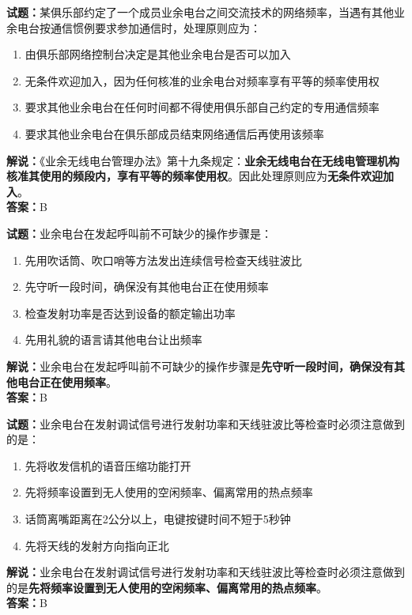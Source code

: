 \documentclass{ctexbook}
\begin{document}
\noindent\textbf{试题：}某俱乐部约定了一个成员业余电台之间交流技术的网络频率，当遇有其他业余电台按通信惯例要求参加通信时，处理原则应为：
\begin{enumerate}[leftmargin=3em]
\item 由俱乐部网络控制台决定是其他业余电台是否可以加入
\item 无条件欢迎加入，因为任何核准的业余电台对频率享有平等的频率使用权
\item 要求其他业余电台在任何时间都不得使用俱乐部自己约定的专用通信频率
\item 要求其他业余电台在俱乐部成员结束网络通信后再使用该频率
\end{enumerate}
\noindent\textbf{解说：}《业余无线电台管理办法》第十九条规定：\textbf{业余无线电台在无线电管理机构核准其使用的频段内，享有平等的频率使用权}。因此处理原则应为\textbf{无条件欢迎加入}。\\\noindent\textbf{答案：}B



\bigskip


\noindent\textbf{试题：}业余电台在发起呼叫前不可缺少的操作步骤是：
\begin{enumerate}[leftmargin=3em]
\item 先用吹话筒、吹口哨等方法发出连续信号检查天线驻波比
\item 先守听一段时间，确保没有其他电台正在使用频率
\item 检查发射功率是否达到设备的额定输出功率
\item 先用礼貌的语言请其他电台让出频率
\end{enumerate}
\noindent\textbf{解说：}业余电台在发起呼叫前不可缺少的操作步骤是\textbf{先守听一段时间，确保没有其他电台正在使用频率}。\\\noindent\textbf{答案：}B




\bigskip


\noindent\textbf{试题：}业余电台在发射调试信号进行发射功率和天线驻波比等检查时必须注意做到的是：
\begin{enumerate}[leftmargin=3em]
\item 先将收发信机的语音压缩功能打开
\item 先将频率设置到无人使用的空闲频率、偏离常用的热点频率
\item 话筒离嘴距离在2公分以上，电键按键时间不短于5秒钟
\item 先将天线的发射方向指向正北
\end{enumerate}
\noindent\textbf{解说：}业余电台在发射调试信号进行发射功率和天线驻波比等检查时必须注意做到的是\textbf{先将频率设置到无人使用的空闲频率、偏离常用的热点频率}。\\\noindent\textbf{答案：}B
\end{document}
